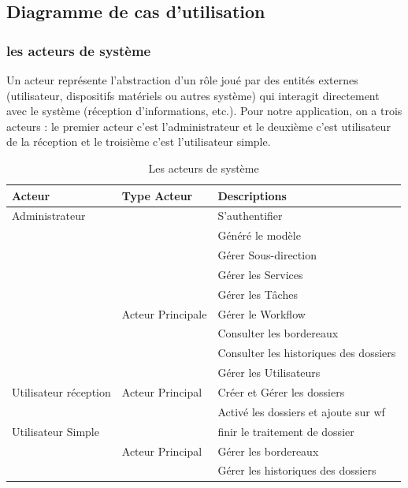  
 
 
 
 
 
 
 
 
 
\subsection{ Diagramme de cas d’utilisation }
 
  \subsubsection{ les acteurs de système  }
 
Un acteur représente l'abstraction d'un rôle joué par des entités externes (utilisateur, dispositifs matériels ou autres système) qui interagit directement avec le système (réception d’informations, etc.). Pour notre application, on a trois acteurs : le premier acteur c'est l'administrateur et le deuxième c'est utilisateur de la réception et le troisième c'est l'utilisateur simple.
\begin{table}[H]

	   
	\begin{tabular}{|l|l|l|}
		\hline
		\multicolumn{1}{|l|}{Acteur} & Type Acteur & Descriptions \\ \hline
	Administrateur	 &  & S’authentifier \\ \cline{3-3} 
		&  &Généré le modèle\\ \cline{3-3} 
		&  & Gérer Sous-direction \\ \cline{3-3} 
	 	&  & Gérer les Services \\ \cline{3-3} 	
	 	&  & Gérer les Tâches \\ \cline{3-3} 
 
		& Acteur Principale & Gérer   le Workflow   \\ \cline{3-3} 
				&  &Consulter les bordereaux   \\ \cline{3-3} 
						&  &Consulter les historiques des dossiers\\ \cline{3-3} 
								&  & Gérer les Utilisateurs \\ \hline 
		
  
			Utilisateur réception	 	&Acteur Principal & Créer et Gérer les dossiers  \\ \cline{3-3}  
		&  & Activé les dossiers et ajoute sur wf \\ \hline
 
		Utilisateur Simple	&  & finir le traitement de dossier  \\ \cline{3-3} 
		&  Acteur Principal& Gérer les bordereaux  \\ \cline{3-3} 
		&  &Gérer les historiques des dossiers\\ \hline 
	\end{tabular}
	   	\label{fig:as}
        \caption{Les acteurs de système}
\end{table}
 
